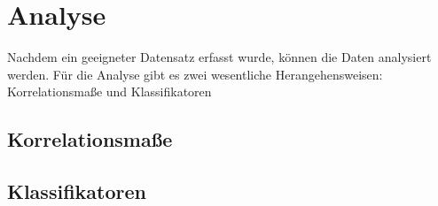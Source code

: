 \section{Analyse}
\label{sec:analyse}
Nachdem ein geeigneter Datensatz erfasst wurde, können die Daten analysiert werden.
Für die Analyse gibt es zwei wesentliche Herangehensweisen: Korrelationsmaße und Klassifikatoren
\subsection{Korrelationsmaße}

\subsection{Klassifikatoren}
